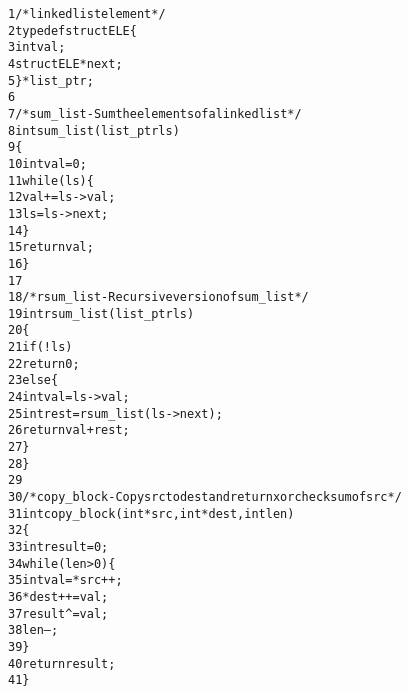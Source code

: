 \begin{alltt}
{\scriptsize   1} /* linked list element */
{\scriptsize   2} typedef struct ELE \verb:{:
{\scriptsize   3}     int val;
{\scriptsize   4}     struct ELE *next;
{\scriptsize   5} \verb:}: *list_ptr;
{\scriptsize   6} 
{\scriptsize   7} /* sum_list - Sum the elements of a linked list */
{\scriptsize   8} int sum_list(list_ptr ls)
{\scriptsize   9} \verb:{:
{\scriptsize  10}     int val = 0;
{\scriptsize  11}     while (ls) \verb:{:
{\scriptsize  12}         val += ls->val;
{\scriptsize  13}         ls = ls->next;
{\scriptsize  14}     \verb:}:
{\scriptsize  15}     return val;
{\scriptsize  16} \verb:}:
{\scriptsize  17} 
{\scriptsize  18} /* rsum_list - Recursive version of sum_list */
{\scriptsize  19} int rsum_list(list_ptr ls)
{\scriptsize  20} \verb:{:
{\scriptsize  21}     if (!ls)
{\scriptsize  22}         return 0;
{\scriptsize  23}     else \verb:{:
{\scriptsize  24}         int val = ls->val;
{\scriptsize  25}         int rest = rsum_list(ls->next);
{\scriptsize  26}         return val + rest;
{\scriptsize  27}     \verb:}:
{\scriptsize  28} \verb:}:
{\scriptsize  29} 
{\scriptsize  30} /* copy_block - Copy src to dest and return xor checksum of src */
{\scriptsize  31} int copy_block(int *src, int *dest, int len)
{\scriptsize  32} \verb:{:
{\scriptsize  33}     int result = 0;
{\scriptsize  34}     while (len > 0) \verb:{:
{\scriptsize  35}         int val = *src++;
{\scriptsize  36}         *dest++ = val;
{\scriptsize  37}         result ^= val;
{\scriptsize  38}         len--;
{\scriptsize  39}     \verb:}:
{\scriptsize  40}     return result;
{\scriptsize  41} \verb:}:
\end{alltt}

